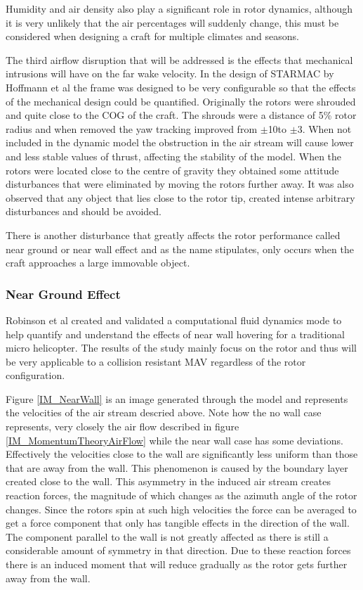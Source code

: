 Humidity and air density also play a significant role in rotor dynamics, although it is very unlikely that the air percentages will suddenly change, this must be considered when designing a craft for multiple climates and seasons.

The third airflow disruption that will be addressed is the effects that mechanical intrusions will have on the far wake velocity. In the design of STARMAC by Hoffmann et al \cite{Hoffmann} the frame was designed to be very configurable so that the effects of the mechanical design could be quantified. Originally the rotors were shrouded and quite close to the COG of the craft. The shrouds were a distance of 5\% rotor radius and when removed the yaw tracking improved from $\pm$10\textdegree to $\pm$3\textdegree. When not included in the dynamic model the obstruction in the air stream will cause lower and less stable values of thrust, affecting the stability of the model. 
When the rotors were located close to the centre of gravity they obtained some attitude disturbances that were eliminated by moving the rotors further away. It was also observed that any object that lies close to the rotor tip, created intense arbitrary disturbances and should be avoided. 

There is another disturbance that greatly affects the rotor performance called near ground or near wall effect and as the name stipulates, only occurs when the craft approaches a large immovable object.

\subsubsection{Near Ground Effect} \label{SSSECT_NearGroundEffect}
Robinson et al \cite{NearWall} created and validated a computational fluid dynamics mode to help quantify and understand the effects of near wall hovering for a traditional micro helicopter. The results of the study mainly focus on the rotor and thus will be very applicable to a collision resistant MAV regardless of the rotor configuration.

Figure \ref{IM_NearWall} is an image generated through the model and represents the velocities of the air stream descried above. Note how the no wall case represents, very closely the air flow described in figure \ref{IM_MomentumTheoryAirFlow} while the near wall case has some deviations. Effectively the velocities close to the wall are significantly less uniform than those that are away from the wall. This phenomenon is caused by the boundary layer created close to the wall. This asymmetry in the induced air stream creates reaction forces, the magnitude of which changes as the azimuth angle of the rotor changes. Since the rotors spin at such high velocities the force can be averaged to get a force component that only has tangible effects in the direction of the wall. The component parallel to the wall is not greatly affected as there is still a considerable amount of symmetry in that direction. Due to these reaction forces there is an induced moment that will reduce gradually as the rotor gets further away from the wall.  

